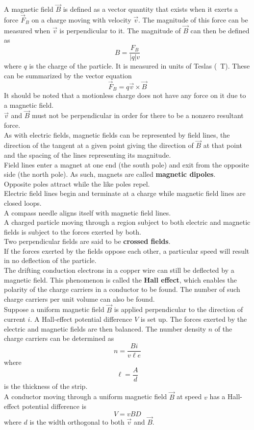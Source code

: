 \documentclass{subfiles}
\begin{document}
	A magnetic field \(\vec{B}\) is defined as a vector quantity that exists when it exerts a force \(\vec{F}_B\) on a charge moving with velocity \(\vec{v}\). The magnitude of this force can be measured when \(\vec{v}\) is perpendicular to it. The magnitude of \(\vec{B}\) can then be defined as
		\[B = \frac{F_B}{|q|v} \tag{magnitude of magnetic field}\]
		where \(q\) is the charge of the particle. It is measured in units of Teslas (\SI{}{T}).
		These can be summarized by the vector equation
		\[\vec{F}_B = q\vec{v} \times \vec{B} \tag{magnetic force}\]
		It should be noted that a motionless charge does not have any force on it due to a magnetic field. \\
		\(\vec{v}\) and \(\vec{B}\) must not be perpendicular in order for there to be a nonzero resultant force. \\
	As with electric fields, magnetic fields can be represented by field lines, the direction of the tangent at a given point giving the direction of \(\vec{B}\) at that point and the spacing of the lines representing its magnitude. \\
	Field lines enter a magnet at one end (the south pole) and exit from the opposite side (the north pole). As such, magnets are called \textbf{magnetic dipoles}. \\
		Opposite poles attract while the like poles repel. \\
	Electric field lines begin and terminate at a charge while magnetic field lines are closed loops. \\
	A compass needle aligns itself with magnetic field lines. \\
	A charged particle moving through a region subject to both electric and magnetic fields is subject to the forces exerted by both. \\
		Two perpendicular fields are said to be \textbf{crossed fields}. \\
		If the forces exerted by the fields oppose each other, a particular speed will result in no deflection of the particle. \\
	The drifting conduction electrons in a copper wire can still be deflected by a magnetic field. This phenomenon is called the \textbf{Hall effect}, which enables the polarity of the charge carriers in a conductor to be found. The number of such charge carriers per unit volume can also be found. \\
	Suppose a uniform magnetic field \(\vec{B}\) is applied perpendicular to the direction of current \(i\). A Hall-effect potential difference \(V\) is set up. The forces exerted by the electric and magnetic fields are then balanced. The number density \(n\) of the charge carriers can be determined as
		\[n = \frac{Bi}{v\ell e}\]
		where
		\[\ell = \frac{A}{d}\]
		is the thickness of the strip. \\
	A conductor moving through a uniform magnetic field \(\vec{B}\) at speed \(v\) has a Hall-effect potential difference is
		\[V = vBD \tag{Hall-effect potential difference}\]
		where \(d\) is the width orthogonal to both \(\vec{v}\) and \(\vec{B}\). 
\end{document}
